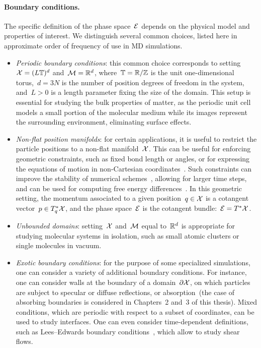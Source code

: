 \paragraph{Boundary conditions.}
The specific definition of the phase space~$\mathcal{E}$ depends on the physical model and properties of interest. We distinguish several common choices,  listed here in approximate order of frequency of use in MD simulations.
\begin{itemize}
    \item{\textit{Periodic boundary conditions}: this common choice corresponds to setting~$\mathcal{X} = (L\mathbb{T})^d$ and~$\mathcal{M}=\mathbb{R}^d$, where~$\mathbb{T}=\mathbb{R}/\mathbb{Z}$ is the unit one-dimensional torus,~$d=3N$ is the number of position degrees of freedom in the system, and~$L>0$ is a length parameter fixing the size of the domain. This setup is essential for studying the bulk properties of matter, as the periodic unit cell models a small portion of the molecular medium while its images represent the surrounding environment, eliminating surface effects.}
    \item{\textit{Non-flat position manifolds}: for certain applications, it is useful to restrict the particle positions to a non-flat manifold~$\mathcal{X}$. This can be useful for enforcing geometric constraints, such as fixed bond length or angles, or for expressing the equations of motion in non-Cartesian coordinates~\cite{VJ15}. Such constraints can improve the stability of numerical schemes~\cite{RCB77,A83,BKLS95}, allowing for larger time steps, and can be used for computing free energy differences~\cite{SC98,LRS12}. In this geometric setting, the momentum associated to a given position~$q\in\mathcal{X}$ is a cotangent vector~$p\in T_q^*\mathcal{X}$, and the phase space~$\mathcal{E}$ is the cotangent bundle:~$\mathcal{E}=T^*\mathcal{X}$.}
    \item{\textit{Unbounded domains}: setting~$\mathcal{X}$ and~$\mathcal{M}$ equal to~$\mathbb{R}^d$ is appropriate for studying molecular systems in isolation, such as small atomic clusters or single molecules in vacuum.}
    \item{\textit{Exotic boundary conditions}: for the purpose of some specialized simulations, one can consider a variety of additional boundary conditions. For instance, one can consider walls at the boundary of a domain~$\partial\mathcal{X}$, on which particles are subject to specular or diffuse reflections, or absorption~(the case of absorbing boundaries is considered in Chapters~2 and~3 of this thesis). Mixed conditions, which are periodic with respect to a subset of coordinates, can be used to study interfaces. One can even consider time-dependent definitions, such as Lees--Edwards boundary conditions~\cite{LE72}, which allow to study shear flows.}
\end{itemize}

